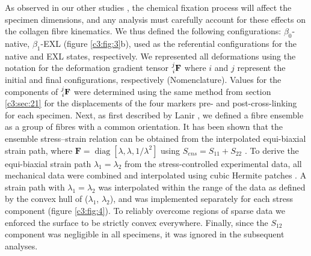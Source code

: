     As observed in our other studies \cite{sacks_biaxial_2000,zhang_generalized_2015}, the chemical fixation process will affect the specimen dimensions, and any analysis must carefully account for these effects on the collagen fibre kinematics. We thus defined the following configurations: $\beta_0$-native, $\beta_1$-EXL (figure \ref{c3:fig:3}b), used as the referential configurations for the native and EXL states, respectively. We represented all deformations using the notation for the deformation gradient tensor $\prescript{j}{i}{\mathbf{F}}$ where $i$ and $j$ represent the initial and final configurations, respectively (Nomenclature). Values for the components of $\prescript{j}{i}{\mathbf{F}}$ were determined using the same method from section \ref{c3:sec:21} for the displacements of the four markers pre- and post-cross-linking for each specimen. Next, as first described by Lanir \cite{lanir_constitutive_1983}, we defined a fibre ensemble as a group of fibres with a common orientation. It has been shown that the ensemble stress–strain relation can be obtained from the interpolated equi-biaxial strain path, where $\mathbf{F} = \operatorname{diag}[\lambda, \lambda, 1/\lambda^2]$ using $S_{ens} = S_{11} + S_{22}$ \cite{sacks_incorporation_2003}. To derive the equi-biaxial strain path $\lambda_1 = \lambda_2$ from the stress-controlled experimental data, all mechanical data were combined and interpolated using cubic Hermite patches \cite{fata_insights_2014}. A strain path with $\lambda_1 = \lambda_2$ was interpolated within the range of the data as defined by the convex hull of ($\lambda_1$, $\lambda_2$), and was implemented separately for each stress component (figure \ref{c3:fig:4}). To reliably overcome regions of sparse data we enforced the surface to be strictly convex everywhere. Finally, since the $S_{12}$ component was negligible in all specimens, it was ignored in the subsequent analyses.
    
